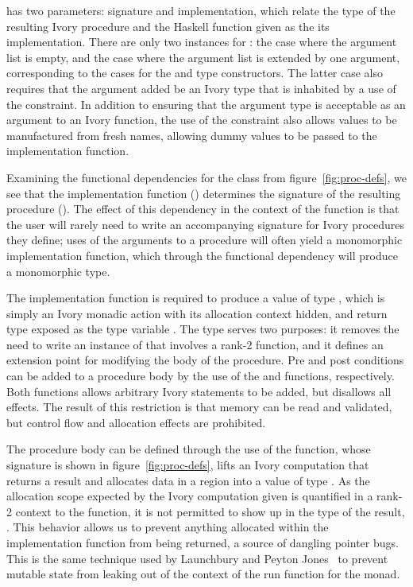  has two parameters: signature and implementation, which relate
the  type of the resulting Ivory procedure and the Haskell function
given as the its implementation.  There are only two instances for
: the case where the argument list is empty, and the case where
the argument list is extended by one argument, corresponding to the cases for
the  and  type constructors.  The latter case also requires
that the argument added be an Ivory type that is inhabited by a use of the
 constraint.  In addition to ensuring that the argument type is
acceptable as an argument to an Ivory function, the use of the 
constraint also allows values to be manufactured from fresh names, allowing
dummy values to be passed to the implementation function.

Examining the functional dependencies for the  class from
figure~\ref{fig:proc-defs}, we see that the implementation function ()
determines the signature of the resulting procedure ().  The effect of
this dependency in the context of the  function is that the user will
rarely need to write an accompanying  signature for Ivory procedures
they define; uses of the arguments to a procedure will often yield a monomorphic
implementation function, which through the functional dependency will produce a
monomorphic  type.

The implementation function is required to produce a value of type ,
which is simply an Ivory monadic action with its allocation context hidden, and
return type exposed as the type variable .  The  type serves two
purposes: it removes the need to write an instance of  that
involves a rank-2 function, and it defines an extension point for modifying the
body of the procedure.  Pre and post conditions can be added to a procedure body
by the use of the  and  functions, respectively.  Both
functions allows arbitrary Ivory statements to be added, but disallows all
effects.  The result of this restriction is that memory can be read and
validated, but control flow and allocation effects are prohibited.

The procedure body can be defined through the use of the  function,
whose signature is shown in figure~\ref{fig:proc-defs}, lifts an Ivory
computation that returns a result  and allocates data in a region 
into a value of type .  As the allocation scope expected by the Ivory
computation given is quantified in a rank-2 context to the  function,
it is not permitted to show up in the type of the result, .  This behavior
allows us to prevent anything allocated within the implementation function from
being returned, a source of dangling pointer bugs.  This is the same technique
used by Launchbury and Peyton Jones~\cite{stmonad} to prevent mutable state
from leaking out of the context of the run function for the  monad.

